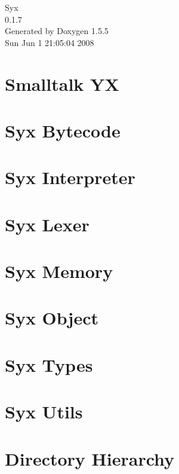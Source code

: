 \documentclass[a4paper]{book}
\begin{document}
\begin{titlepage}
\vspace*{7cm}
\begin{center}
{\Large Syx \\[1ex]\large 0.1.7 }\\
\vspace*{1cm}
{\large Generated by Doxygen 1.5.5}\\
\vspace*{0.5cm}
{\small Sun Jun 1 21:05:04 2008}\\
\end{center}
\end{titlepage}
\clearemptydoublepage
{}
\tableofcontents
\clearemptydoublepage
{}
\chapter{Smalltalk YX }
\label{index}\hypertarget{index}{}
\chapter{Syx Bytecode}

\chapter{Syx Interpreter}

\chapter{Syx Lexer}

\chapter{Syx Memory}

\chapter{Syx Object}

\chapter{Syx Types}

\chapter{Syx Utils}

\chapter{Directory Hierarchy}

\end{document}
